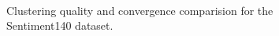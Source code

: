 \documentclass[runningheads]{llncs}
\begin{document}
\begin{figure}[H]
\centering
{}
\\
\caption{Clustering quality and convergence comparision for the Sentiment140 dataset.}
\label{fig:senti140}
\end{figure}
\end{document}

